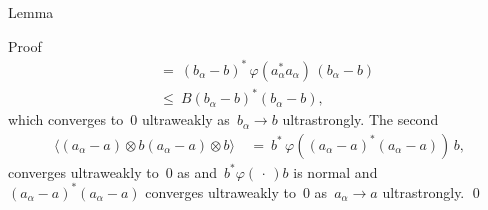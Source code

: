 \documentclass[b]{subfiles}
\begin{document}
\begin{parsec}
\begin{point}{Lemma}
\begin{point}{Proof}
\begin{align*}
    & \ = \ 
    (b_\alpha - b)^* \,\varphi (a_\alpha^* a_\alpha) \,(b_\alpha - b) \\
    & \ \leq \ 
    B (b_\alpha - b)^*  (b_\alpha - b),
\end{align*}
which converges to~$0$ ultraweakly as~$b_\alpha \to b$ ultrastrongly.
The second
\begin{align*}
    \langle
        (a_\alpha - a) \otimes b
        (a_\alpha - a) \otimes b \rangle
        & \ = \ 
        b^* \,\varphi((a_\alpha - a)^* (a_\alpha - a)) \, b,
\end{align*}
converges ultraweakly to~$0$
as and~$ b^* \varphi(\,\cdot\,) b$ is normal
and~$(a_\alpha - a)^*(a_\alpha - a)$ converges ultraweakly to~$0$
as~$a_\alpha \to a$ ultrastrongly. \qed
\end{point}
\end{point}
\end{parsec}
\end{document}

